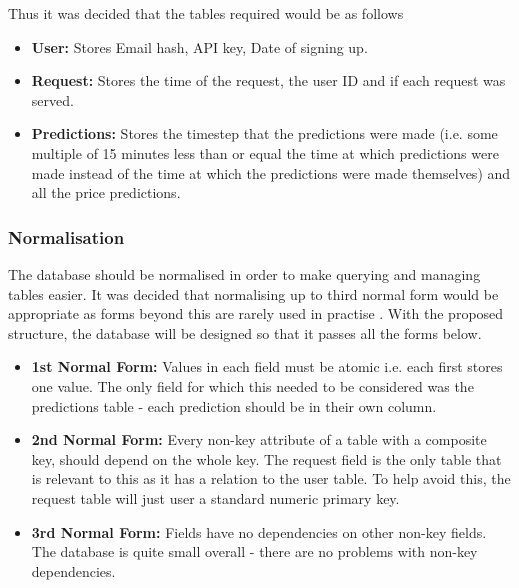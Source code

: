         Thus it was decided that the tables required would be as follows
        \begin{itemize}

            \item \textbf{User:} Stores Email hash, API key, Date of signing up. 

            \item \textbf{Request:} Stores the time of the request, the user ID and if each request was served.
            
            \item \textbf{Predictions:} Stores the timestep that the predictions were made (i.e. some multiple of 15 minutes less than or equal the time at which predictions were made instead of the time at which the predictions were made themselves) and all the price predictions.
            
        \end{itemize}
        
            \subsubsection{Normalisation}
            The database should be normalised in order to make querying and managing tables easier. It was decided that normalising up to third normal form would be appropriate as forms beyond this are rarely used in practise \cite{mariadb_knowledgebase}. With the proposed structure, the database will be designed so that it passes all the forms below.

            \begin{itemize}

                \item \textbf{1st Normal Form:} Values in each field must be atomic i.e. each first stores one value. The only field for which this needed to be considered was the predictions table - each prediction should be in their own column.
                
                \item \textbf{2nd Normal Form:} Every non-key attribute of a table with a composite key, should depend on the whole key. The request field is the only table that is relevant to this as it has a relation to the user table. To help avoid this, the request table will just user a standard numeric primary key.
                
                \item \textbf{3rd Normal Form:} Fields have no dependencies on other non-key fields. The database is quite small overall - there are no problems with non-key dependencies. 
            
            \end{itemize}

